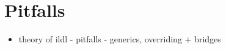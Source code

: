 \section{Pitfalls}
\label{sec:pitfalls}

\begin{itemize}
  \item theory of ildl - pitfalls - generics, overriding + bridges
\end{itemize}
